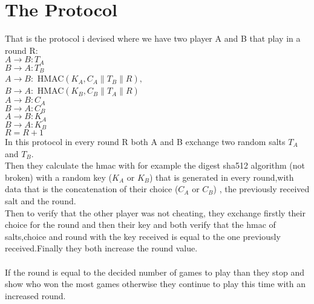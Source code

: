 \documentclass{article}
\begin{document}
\section{The Protocol}
That is the protocol i devised where we have two player A and B that play in a round R:\\
$A\rightarrow B:T_{A}$\\
$B\rightarrow A:T_{B}$\\
$A\rightarrow B:$ HMAC$\left( K_{A},C_{A}\left\| T_{B}\right\| R\right), $\\
$B\rightarrow A:$ HMAC$\left( K_{B},C_{B}\left\| T_{A}\right\| R\right) $\\
$A\rightarrow B: C_{A}$\\
$B\rightarrow A: C_{B}$\\
$A\rightarrow B:K_{A}$\\
$B\rightarrow A:K_{B}$\\
$R=R+1$\\
In this protocol in every round R both A and B exchange two random salts $T_{A}$ and $T_{B}$.\\Then they calculate the hmac with for example the digest sha512 algorithm (not broken) with a random key ($K_{A}$ or $K_{B}$) that is generated in every round,with data that is the concatenation of their choice ($C_{A}$ or $C_{B}$) , the previously received salt and the round.\\Then to verify that the other player was not cheating, they exchange firstly their choice for the round and then their key and both verify that the hmac of salts,choice and round with the key received is equal to the one previously received.Finally they both increase the round value.\\\\If the round is equal to the decided number of games to play than they stop and show who won the most games otherwise they continue to play this time with an increased round.
\end{document}
